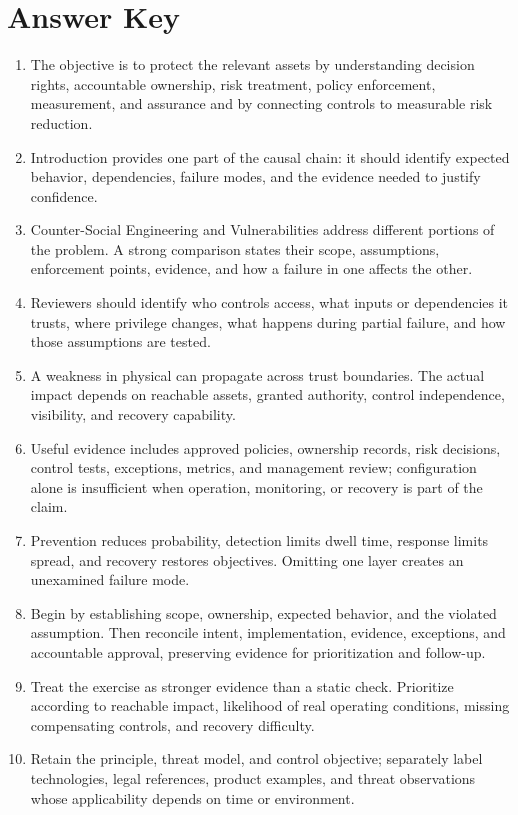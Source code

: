 \documentclass[11pt]{article}
\begin{document}
\section*{Answer Key}
\begin{enumerate}
\item The objective is to protect the relevant assets by understanding decision rights, accountable ownership, risk treatment, policy enforcement, measurement, and assurance and by connecting controls to measurable risk reduction.
\item Introduction provides one part of the causal chain: it should identify expected behavior, dependencies, failure modes, and the evidence needed to justify confidence.
\item Counter-Social Engineering and Vulnerabilities address different portions of the problem. A strong comparison states their scope, assumptions, enforcement points, evidence, and how a failure in one affects the other.
\item Reviewers should identify who controls access, what inputs or dependencies it trusts, where privilege changes, what happens during partial failure, and how those assumptions are tested.
\item A weakness in physical can propagate across trust boundaries. The actual impact depends on reachable assets, granted authority, control independence, visibility, and recovery capability.
\item Useful evidence includes approved policies, ownership records, risk decisions, control tests, exceptions, metrics, and management review; configuration alone is insufficient when operation, monitoring, or recovery is part of the claim.
\item Prevention reduces probability, detection limits dwell time, response limits spread, and recovery restores objectives. Omitting one layer creates an unexamined failure mode.
\item Begin by establishing scope, ownership, expected behavior, and the violated assumption. Then reconcile intent, implementation, evidence, exceptions, and accountable approval, preserving evidence for prioritization and follow-up.
\item Treat the exercise as stronger evidence than a static check. Prioritize according to reachable impact, likelihood of real operating conditions, missing compensating controls, and recovery difficulty.
\item Retain the principle, threat model, and control objective; separately label technologies, legal references, product examples, and threat observations whose applicability depends on time or environment.
\end{enumerate}
\end{document}
